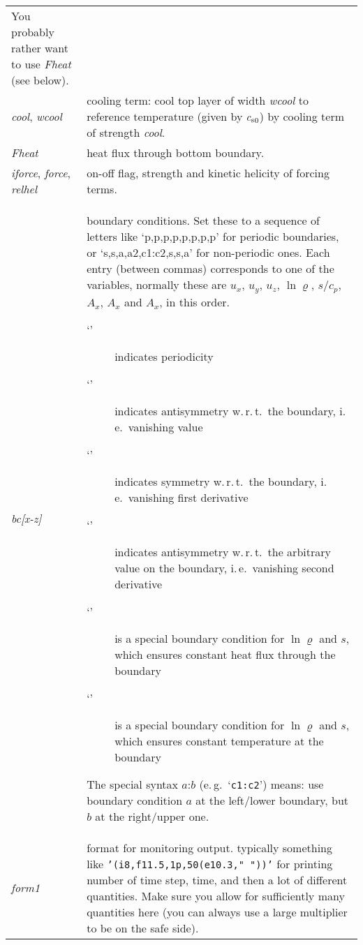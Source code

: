 \documentclass[12pt,twoside,notitlepage,a4paper]{article}
\newcommand{\code}[1]{\texttt{#1}}
\newcommand{\var}[1]{\textsl{#1}\index{#1}\/}
\newcommand{\command}[1]{\code{#1}\index{#1}}
\newcommand{\option}[1]{`\command{#1}'}
\newcommand{\cs}            {c_{\rm s}}
\begin{document}
\begin{longtable}{lp{}}
                 You probably rather want to use \var{Fheat} (see below). \\
  \var{cool}, \var{wcool}
               & cooling term: cool top layer of width \var{wcool} to
                 reference temperature (given by ${\cs}_0$) by cooling term
                 of strength \var{cool}. \\
  \var{Fheat}  & heat flux through bottom boundary. \\
  \var{iforce}, \var{force}, \var{relhel}
               & on-off flag, strength and kinetic helicity of forcing
                 terms. \\
  \var{bc[x-z]}
               & boundary conditions. Set these to a sequence of letters 
                 like `p,p,p,p,p,p,p,p' for periodic boundaries, or
                 `s,s,a,a2,c1:c2,s,s,a' for non-periodic ones.
                 Each entry (between commas) corresponds to one of the
                 variables, normally these are $u_x$, $u_y$, $u_z$,
                 $\ln\varrho$, $s/c_p$, $A_x$, $A_x$ and $A_x$, in this
                 order.
                 \begin{description}
                 \item[\option{p}] indicates periodicity
                 \item[\option{a}] indicates antisymmetry w.\,r.\,t.~the
                   boundary, i.\,e.~vanishing value
                 \item[\option{s}] indicates symmetry w.\,r.\,t.~the
                   boundary, i.\,e.~vanishing first derivative
                 \item[\option{a2}] indicates antisymmetry w.\,r.\,t.~the
                   arbitrary value on the boundary, i.\,e.~vanishing
                   second derivative
                 \item[\option{c1}] is a special boundary condition for
                   $\ln\varrho$ and $s$, which ensures constant heat flux
                   through the boundary
                 \item[\option{c2}] is a special boundary condition for
                   $\ln\varrho$ and $s$, which ensures constant
                   temperature at the boundary 
                 \end{description}
                 The special syntax $a$:$b$ (e.\,g.~`\code{c1:c2}') means: use
                 boundary condition $a$ at the left/lower boundary, but
                 $b$ at the right/upper one. 
                 \\
  \var{form1}  & format for monitoring output. typically something like
                 \code{'(i8,f11.5,1p,50(e10.3," "))'} for printing number
                 of time step, time, and then a lot of different
                 quantities. Make sure you allow for sufficiently many
                 quantities here (you can always use a large multiplier to
                 be on the safe side). \\
\bottomrule
\end{longtable}
\end{document}
